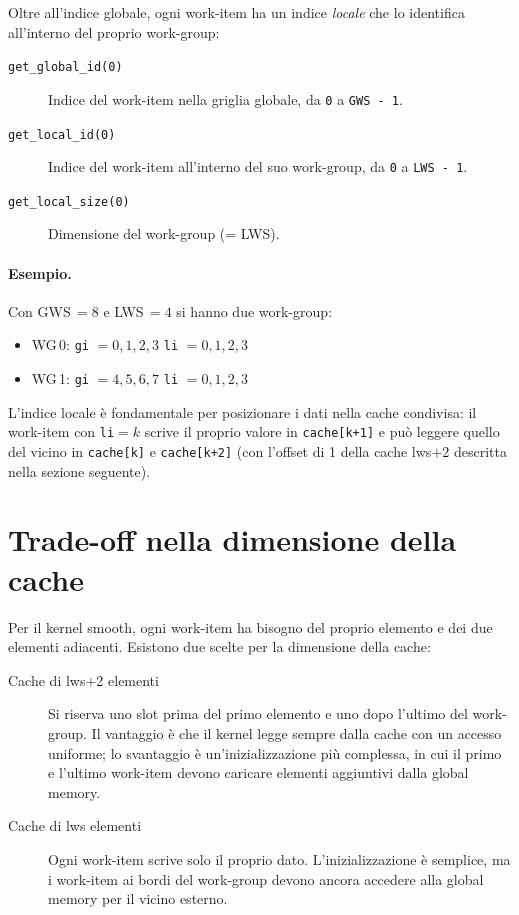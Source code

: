 Oltre all'indice globale, ogni work-item ha un indice \emph{locale} che lo identifica all'interno del proprio work-group:

\begin{description}
    \item[\texttt{get\_global\_id(0)}] Indice del work-item nella griglia globale, da \texttt{0} a \texttt{GWS\,-\,1}.
    \item[\texttt{get\_local\_id(0)}] Indice del work-item all'interno del suo work-group, da \texttt{0} a \texttt{LWS\,-\,1}.
    \item[\texttt{get\_local\_size(0)}] Dimensione del work-group (= LWS).
\end{description}

\paragraph{Esempio.} Con GWS\,$=8$ e LWS\,$=4$ si hanno due work-group:
\begin{itemize}
    \item WG\,0: \texttt{gi} $= 0,1,2,3$ \quad \texttt{li} $= 0,1,2,3$
    \item WG\,1: \texttt{gi} $= 4,5,6,7$ \quad \texttt{li} $= 0,1,2,3$
\end{itemize}

L'indice locale è fondamentale per posizionare i dati nella cache condivisa: il work-item con \texttt{li}$= k$ scrive il proprio valore in \texttt{cache[k+1]} e può leggere quello del vicino in \texttt{cache[k]} e \texttt{cache[k+2]} (con l'offset di 1 della cache lws$+$2 descritta nella sezione seguente).

\section{Trade-off nella dimensione della cache}\label{sec:opencl_lmem_tradeoff}

Per il kernel smooth, ogni work-item ha bisogno del proprio elemento e dei due elementi adiacenti. Esistono due scelte per la dimensione della cache:

\begin{description}
    \item[Cache di lws$+$2 elementi] Si riserva uno slot prima del primo elemento e uno dopo l'ultimo del work-group. Il vantaggio è che il kernel legge sempre dalla cache con un accesso uniforme; lo svantaggio è un'inizializzazione più complessa, in cui il primo e l'ultimo work-item devono caricare elementi aggiuntivi dalla global memory.

    \item[Cache di lws elementi] Ogni work-item scrive solo il proprio dato. L'inizializzazione è semplice, ma i work-item ai bordi del work-group devono ancora accedere alla global memory per il vicino esterno.
\end{description}

